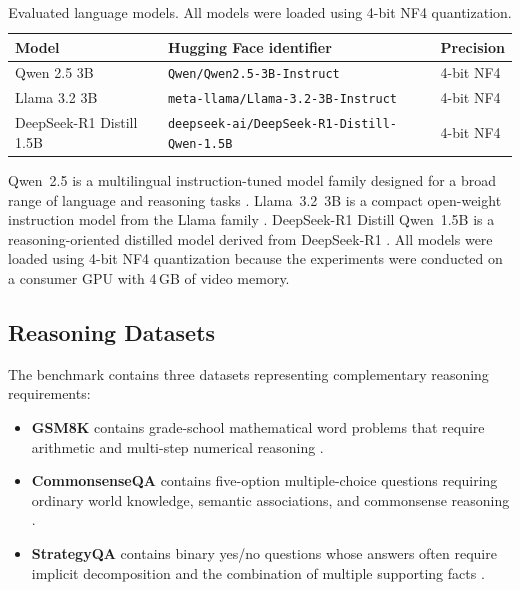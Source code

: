 \documentclass{article}
\begin{document}
\begin{table}[t]
\centering
\small
\caption{Evaluated language models. All models were loaded using
4-bit NF4 quantization.}
\label{tab:models}
\begin{tabular}{p{3.0cm}p{5.7cm}p{1.7cm}}
\toprule
\textbf{Model} &
\textbf{Hugging Face identifier} &
\textbf{Precision} \\
\midrule
Qwen 2.5 3B &
\texttt{Qwen/Qwen2.5-3B-Instruct} &
4-bit NF4 \\

Llama 3.2 3B &
\texttt{meta-llama/Llama-3.2-3B-Instruct} &
4-bit NF4 \\

DeepSeek-R1 Distill 1.5B &
\texttt{deepseek-ai/DeepSeek-R1-Distill-Qwen-1.5B} &
4-bit NF4 \\
\bottomrule
\end{tabular}
\end{table}

Qwen~2.5 is a multilingual instruction-tuned model family designed
for a broad range of language and reasoning tasks
\cite{qwen2024qwen25}. Llama~3.2~3B is a compact open-weight
instruction model from the Llama family
\cite{grattafiori2024llama3}. DeepSeek-R1 Distill Qwen~1.5B is a
reasoning-oriented distilled model derived from DeepSeek-R1
\cite{deepseek2025r1}. All models were loaded using 4-bit NF4
quantization because the experiments were conducted on a consumer GPU
with 4\,GB of video memory.

\subsection{Reasoning Datasets}

The benchmark contains three datasets representing complementary
reasoning requirements:

\begin{itemize}
    \item \textbf{GSM8K} contains grade-school mathematical word
    problems that require arithmetic and multi-step numerical
    reasoning \cite{cobbe2021gsm8k}.

    \item \textbf{CommonsenseQA} contains five-option
    multiple-choice questions requiring ordinary world knowledge,
    semantic associations, and commonsense reasoning
    \cite{talmor2019commonsenseqa}.

    \item \textbf{StrategyQA} contains binary yes/no questions whose
    answers often require implicit decomposition and the combination
    of multiple supporting facts \cite{geva2021strategyqa}.
\end{itemize}
\end{document}
